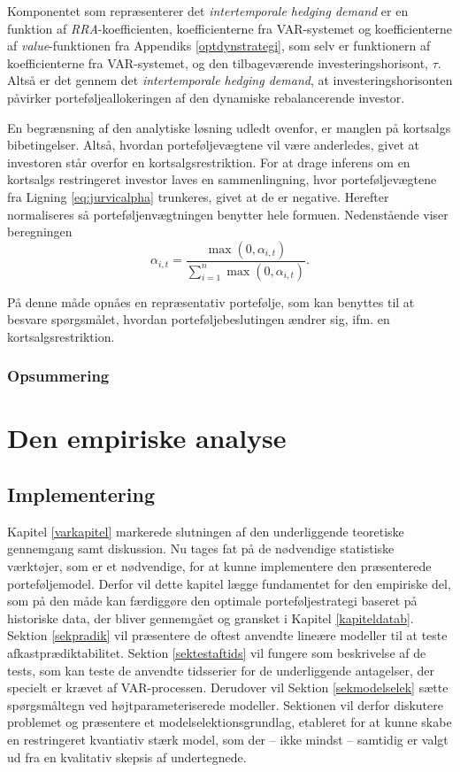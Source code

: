 \documentclass[
  a4paper,
  oneside]{memoir}
\begin{document}
Komponentet som repræsenterer det \emph{intertemporale hedging demand} er en funktion af \emph{RRA}-koefficienten, koefficienterne fra VAR-systemet og koefficienterne af \emph{value}-funktionen fra Appendiks \ref{optdynstrategi}, som selv er funktionern af koefficienterne fra VAR-systemet, og den tilbageværende investeringshorisont, \(\tau\). Altså er det gennem det \emph{intertemporale hedging demand}, at investeringshorisonten påvirker porteføljeallokeringen af den dynamiske rebalancerende investor.

En begrænsning af den analytiske løsning udledt ovenfor, er manglen på kortsalgs bibetingelser. Altså, hvordan porteføljevægtene vil være anderledes, givet at investoren står overfor en kortsalgsrestriktion. For at drage inferens om en kortsalgs restringeret investor laves en sammenlingning, hvor porteføljevægtene fra Ligning \eqref{eq:jurvicalpha} trunkeres, givet at de er negative. Herefter normaliseres så porteføljenvægtningen benytter hele formuen. Nedenstående viser beregningen
\begin{equation}
\alpha_{i,t}=\frac{\max(0,\alpha_{i,t})}{\sum_{i=1}^n \max(0,\alpha_{i,t})}.\label{eq:kortsalgsrestr}
\end{equation}

På denne måde opnåes en repræsentativ portefølje, som kan benyttes til at besvare spørgsmålet, hvordan porteføljebeslutingen ændrer sig, ifm. en kortsalgsrestriktion.

\hypertarget{opsummering-1}{%
\section{Opsummering}\label{opsummering-1}}

\part{Den empiriske analyse}

\hypertarget{imple}{%
\chapter{Implementering}\label{imple}}

Kapitel \ref{varkapitel} markerede slutningen af den underliggende teoretiske gennemgang samt diskussion. Nu tages fat på de nødvendige statistiske værktøjer, som er et nødvendige, for at kunne implementere den præsenterede porteføljemodel. Derfor vil dette kapitel lægge fundamentet for den empiriske del, som på den måde kan færdiggøre den optimale porteføljestrategi baseret på historiske data, der bliver gennemgået og gransket i Kapitel \ref{kapiteldatab}. Sektion \ref{sekpradik} vil præsentere de oftest anvendte lineære modeller til at teste afkastprædiktabilitet. Sektion \ref{sektestaftids} vil fungere som beskrivelse af de tests, som kan teste de anvendte tidsserier for de underliggende antagelser, der specielt er krævet af VAR-processen. Derudover vil Sektion \ref{sekmodelselek} sætte spørgsmåltegn ved højtparameteriserede modeller. Sektionen vil derfor diskutere problemet og præsentere et modelselektionsgrundlag, etableret for at kunne skabe en restringeret kvantiativ stærk model, som der -- ikke mindst -- samtidig er valgt ud fra en kvalitativ skepsis af undertegnede.
\end{document}
